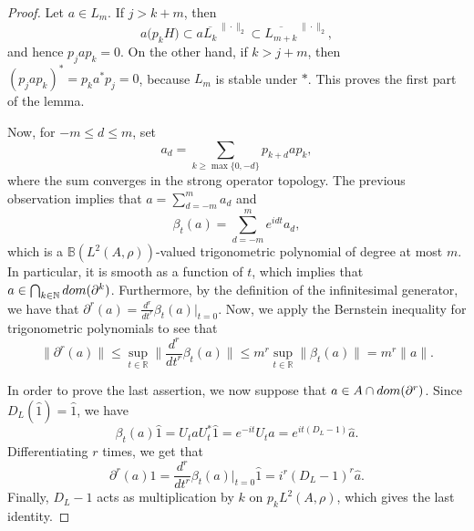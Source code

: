 \documentclass[10pt,a4paper]{amsart}
\def\R{\mathbb{R}}
\begin{document}
\begin{proof}
Let $a\in L_m$.  If $j>k+m$, then
$$
 a\bigl(p_kH\bigr)\subset a\overline{L_k}^{\,\|\cdot\|_2}\subset\overline{L_{m+k}}^{\,\|\cdot\|_2},
$$
and hence $p_jap_k=0$. On the other hand, if $k>j+m$, then $(p_jap_k)^*=p_ka^*p_j=0$, because $L_m$ is stable under $*$. This proves the first part of the lemma.

Now, for $-m\leq d\leq m$, set
\[
 a_d=\sum_{k\geq\max\{0,-d\}}p_{k+d}ap_k,
\]
where the sum converges in the strong operator topology. The previous observation implies that $a=\sum_{d=-m}^ma_d$ and
\begin{equation*}
 \beta_t(a)=\sum_{d=-m}^me^{idt}a_d,
\end{equation*}
which is a $\mathbb B(L^2(A,\rho))$-valued trigonometric polynomial of degree at most $m$. In particular, it is smooth as a function of $t$, which implies that $a\in \bigcap_{k\in\mathbb N}{\rm dom}(\partial^k) $. Furthermore, by the definition of the infinitesimal generator, we have that $\partial^r(a)=\frac{d^r}{dt^r}\beta_t(a)\big|_{t=0}$. Now, we apply the Bernstein inequality for trigonometric polynomials to see that
$$
\|\partial^r(a)\|\leq \sup_{t\in\R}\Big\|\frac{d^r}{dt^r}\beta_t(a) \Big\|\leq m^r \sup_{t\in\R}\|\beta_t(a)\|=m^r\|a\|.
$$

In order to prove the last assertion, we now suppose that $a\in A\cap{\rm dom}(\partial^r)$. Since $D_L(\hat 1)=\hat 1$, we have
\begin{equation*}
 \beta_t(a)\hat 1=U_taU_t^*\hat 1=e^{-it}U_t\hat a=e^{it(D_L-1)}\hat a.
\end{equation*}
Differentiating $r$ times, we get that
$$
 \partial^r(a)\hat1=\frac{d^r}{dt^r}\beta_t(a)\big|_{t=0}\hat 1=i^r(D_L-1)^r\hat a.
$$
Finally, $D_L-1$ acts as multiplication by $k$ on $p_kL^2(A,\rho)$, which gives the last identity.
\end{proof}
\end{document}
